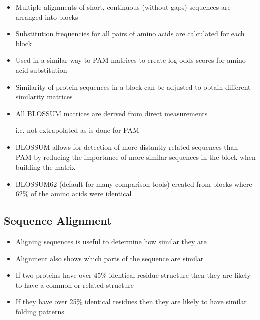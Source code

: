 \documentclass[a4paper]{article}
\begin{document}
\begin{itemize}
  \item
    Multiple alignments of short, continuous (without gaps) sequences are
    arranged into blocks

  \item
    Substitution frequencies for all pairs of amino acids are calculated for
    each block

  \item
    Used in a similar way to PAM matrices to create log-odds scores for amino
    acid substitution

  \item
    Similarity of protein sequences in a block can be adjusted to obtain
    different similarity matrices

  \item
    All BLOSSUM matrices are derived from direct measurements

    i.e. not extrapolated as is done for PAM

  \item
    BLOSSUM allows for detection of more distantly related sequences than PAM
    by reducing the importance of more similar sequences in the block when
    building the matrix

  \item
    BLOSSUM62 (default for many comparison tools) created from blocks where 62\%
    of the amino acids were identical
\end{itemize}

\subsection{Sequence Alignment}

\begin{itemize}
  \item
    Aligning sequences is useful to determine how similar they are

  \item
    Alignment also shows which parts of the sequence are similar

  \item
    If two proteins have over 45\% identical residue structure then they are
    likely to have a common or related structure

  \item
    If they have over 25\% identical residues then they are likely to have
    similar folding patterns
\end{itemize}
\end{document}
